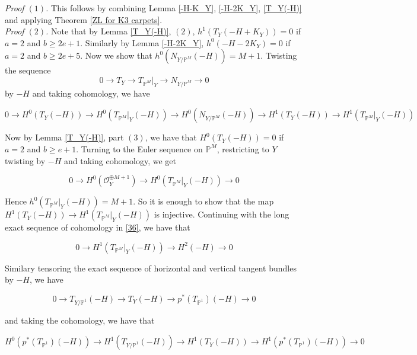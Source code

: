 \documentclass[11pt,twoside]{amsart}
\theoremstyle{plain}
\numberwithin{equation}{section}
\theoremstyle{definition}
\begin{document}
\noindent\textit{Proof $(1)$.} This follows by combining Lemma \ref{-H-K_Y}, \ref{-H-2K_Y}, \ref{T_Y(-H)} and applying Theorem \ref{ZL for K3 carpets}. \\

\noindent\textit{Proof $(2)$.} Note that by Lemma \ref{T_Y(-H)}, $(2)$, $h^1(T_Y(-H+K_Y)) = 0$ if $a = 2$ and $b \geq 2e+1$. Similarly by Lemma \ref{-H-2K_Y}, $h^0(-H-2K_Y) = 0$ if $a = 2$ and $b \geq 2e+5$. Now we show that $h^0(N_{Y/\mathbb{P}^M}(-H)) = M+1$. Twisting the sequence $$0 \to T_Y \to T_{\mathbb{P}^M}|_Y \to N_{Y/\mathbb{P}^M} \to 0$$ by $-H$ and taking cohomology, we have 

\begin{equation}\label{35}
0 \to H^0(T_Y(-H)) \to H^0(T_{\mathbb{P}^M}|_Y(-H)) \to H^0(N_{Y/\mathbb{P}^M}(-H)) \to H^1(T_Y(-H)) \to H^1(T_{\mathbb{P}^M}|_Y(-H))
\end{equation}

Now by Lemma \ref{T_Y(-H)}, part $(3)$, we have that $H^0(T_Y(-H)) = 0$ if $a = 2$ and $b \geq e+1$. Turning to the Euler sequence on $\mathbb{P}^M$, restricting to $Y$ twisting by $-H$ and taking cohomology, we get

\begin{equation}\label{36}
    0 \to H^0(\mathcal{O}_Y^{\oplus M+1}) \to H^0(T_{\mathbb{P}^M}|_Y(-H)) \to 0
\end{equation}

Hence $h^0(T_{\mathbb{P}^M}|_Y(-H)) = M+1$. So it is enough to show that the map $H^1(T_Y(-H)) \to H^1(T_{\mathbb{P}^M}|_Y(-H))$ is injective. Continuing with the long exact sequence of cohomology in \ref{36}, we have that 

\begin{equation}\label{36}
    0 \to H^1(T_{\mathbb{P}^M}|_Y(-H)) \to H^2(-H) \to 0
\end{equation}

Similary tensoring the exact sequence of horizontal and vertical tangent bundles by $-H$, we have

\begin{equation}\label{37}
    0 \to T_{Y/\mathbb{P}^1}(-H) \to T_Y(-H) \to p^*(T_{\mathbb{P}^1})(-H) \to 0
\end{equation}

and taking the cohomology, we have that 

\begin{equation}\label{38}
    H^0(p^*(T_{\mathbb{P}^1})(-H)) \to H^1(T_{Y/\mathbb{P}^1}(-H)) \to H^1(T_Y(-H)) \to H^1(p^*(T_{\mathbb{P}^1})(-H)) \to 0
\end{equation}
\end{document}
